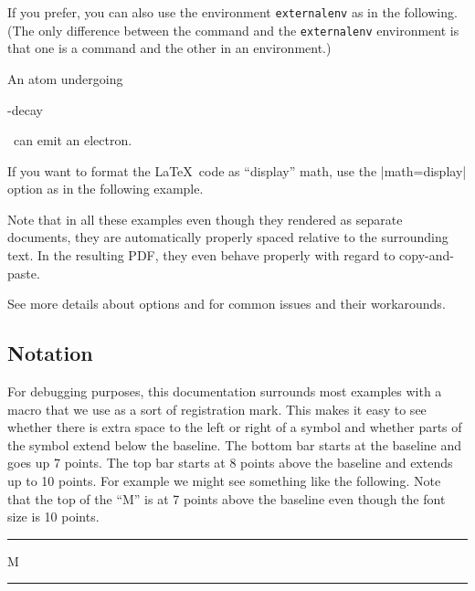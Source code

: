 \documentclass[10pt]{ltxdoc}
\newcommand{\env}[1]{\texttt{#1}}
\def\gauge{%
  \rule{0.2em}{7pt}%
  \llap{\rule[8pt]{0.2em}{2pt}}%
}
\begin{document}
If you prefer, you can also use the environment \env{externalenv} as in the
following.
(The only difference between the  command and the
\env{externalenv} environment is that one is a command and the other in
an environment.)

\begin{tcblisting}{}
An atom undergoing
\begin{externalenv}[preamble={\usepackage{textgreek}}]
\textbeta-decay
\end{externalenv}
~can emit an electron.
\end{tcblisting}

If you want to format the \LaTeX\ code as ``display'' math, use the
|math=display| option as in the following example.

\begin{tcblisting}{}
\end{tcblisting}

Note that in all these examples even though they rendered as separate
documents, they are automatically properly spaced relative to the
surrounding text.
In the resulting PDF, they even behave properly with regard to
copy-and-paste.

See  more details about options and  for common issues and their workarounds.

\subsection{Notation}
\label{subsec:Notation}

For debugging purposes, this documentation surrounds most examples with
a  macro that we use as a sort of registration mark.
This makes it easy to see whether there is extra space to the left or
right of a symbol and whether parts of the symbol extend below the
baseline.
The bottom bar starts at the baseline and goes up 7 points.
The top bar starts at 8 points above the baseline and extends up to 10
points.
For example we might see something like the following.
Note that the top of the ``M'' is at 7 points above the baseline
even though the font size is 10 points.

\begin{tcblisting}{}
\gauge M\gauge
\end{tcblisting}

\end{document}
